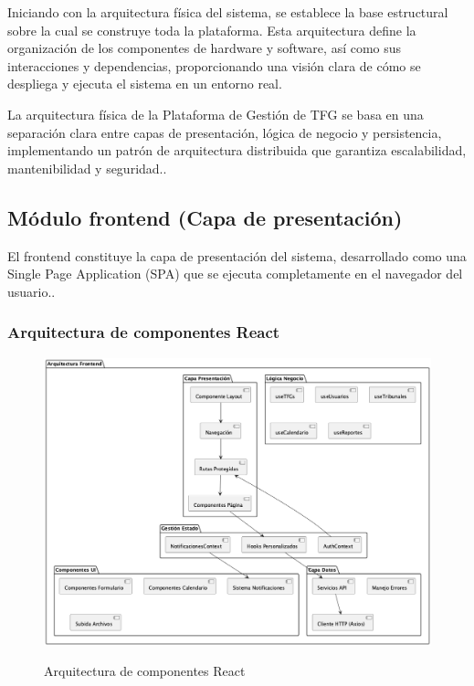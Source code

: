 \documentclass[12pt,a4paper,oneside]{report}
\providecommand{\pandocbounded}[1]{#1}
\begin{document}
Iniciando con la arquitectura física del sistema, se establece la base
estructural sobre la cual se construye toda la plataforma. Esta
arquitectura define la organización de los componentes de hardware y
software, así como sus interacciones y dependencias, proporcionando una
visión clara de cómo se despliega y ejecuta el sistema en un entorno
real.

La arquitectura física de la Plataforma de Gestión de TFG se basa en una
separación clara entre capas de presentación, lógica de negocio y
persistencia, implementando un patrón de arquitectura distribuida que
garantiza escalabilidad, mantenibilidad y seguridad..

\subsection{Módulo frontend (Capa de
presentación)}\label{muxf3dulo-frontend-capa-de-presentaciuxf3n}

El frontend constituye la capa de presentación del sistema, desarrollado
como una Single Page Application (SPA) que se ejecuta completamente en
el navegador del usuario..

\subsubsection{Arquitectura de componentes
React}\label{arquitectura-de-componentes-react}

\begin{figure}
\centering
\pandocbounded{\includegraphics[keepaspectratio,alt={Arquitectura de componentes React}]{processed/images/05_diseno_plantuml_0.png}}
\caption{Arquitectura de componentes React}
\end{figure}
\end{document}
